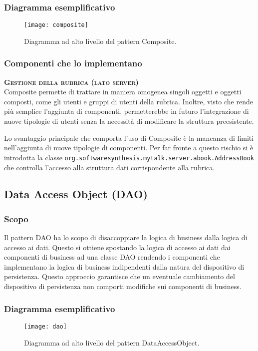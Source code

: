 \subsubsection{Diagramma esemplificativo}
\begin{figure}[h]
\centering
\texttt{[image: composite]}
\caption{Diagramma ad alto livello del pattern Composite.}\label{fig:composite}
\end{figure}
\subsubsection{Componenti che lo implementano}
\begin{description}
\item{\bfseries\scshape Gestione della rubrica (lato server)}\\
Composite permette di trattare in maniera omogenea singoli oggetti e oggetti composti, come gli utenti e gruppi di utenti della rubrica. Inoltre, visto che rende più semplice l'aggiunta di componenti, permetterebbe in futuro l'integrazione di nuove tipologie di utenti senza la necessità di modificare la struttura preesistente.

Lo svantaggio principale che comporta l'uso di Composite è la mancanza di limiti nell'aggiunta di nuove tipologie di componenti. Per far fronte a questo rischio si è introdotta la classe \texttt{org.softwaresynthesis.mytalk.server.abook.AddressBook} che controlla l'accesso alla struttura dati corrispondente alla rubrica.
\end{description}

\subsection{Data Access Object (DAO)}
\subsubsection{Scopo}
Il pattern DAO ha lo scopo di disaccoppiare la logica di business dalla logica di accesso ai dati. Questo si ottiene spostando la logica di accesso ai dati dai componenti di business ad una classe DAO rendendo i componenti che implementano la logica di business indipendenti dalla natura del dispositivo di persistenza. Questo approccio garantisce che un eventuale cambiamento del dispositivo di persistenza non comporti modifiche sui componenti di business.

\subsubsection{Diagramma esemplificativo}
\begin{figure}[h]
\centering
\texttt{[image: dao]}
\caption{Diagramma ad alto livello del pattern DataAccessObject.}\label{fig:dao}
\end{figure}

